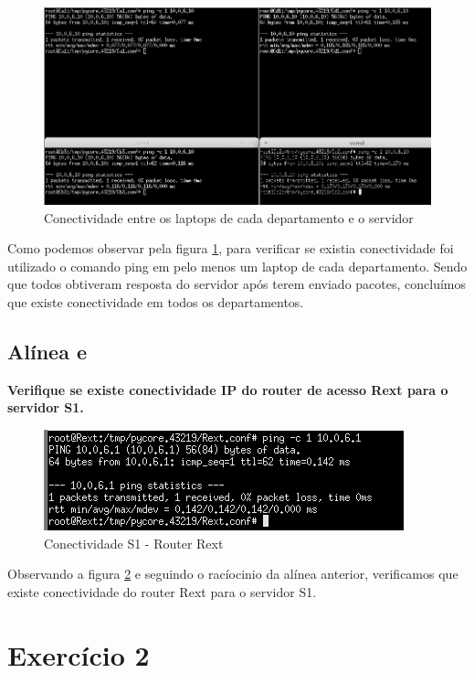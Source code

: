\documentclass[a4paper]{report}
\begin{document}
\begin{figure}[H]
    \centering 
    \includegraphics[width=\textwidth]{images/pingEx1P2.png}
    \caption{Conectividade entre os laptops de cada departamento e o servidor}
    \label{fig:pingEx1P2}
\end{figure}
Como podemos observar pela figura \ref{fig:pingEx1P2}, para verificar se existia
conectividade foi utilizado o comando ping em pelo menos um laptop de cada
departamento. Sendo que todos obtiveram resposta do servidor após terem enviado
pacotes, concluímos que existe conectividade em todos os departamentos.

\subsection{Alínea e}
\textbf{Verifique se existe conectividade IP do router de acesso Rext para o
servidor S1.}\\

\begin{figure}[H]
    \centering 
    \includegraphics[width=\textwidth]{images/RextPing.png}
    \caption{Conectividade S1 - Router Rext}
    \label{fig:RextPing}
\end{figure}
Observando a figura \ref{fig:RextPing} e seguindo o racíocinio da alínea
anterior, verificamos que existe conectividade do router Rext para o servidor
S1.

\section{Exercício 2}
\end{document}
